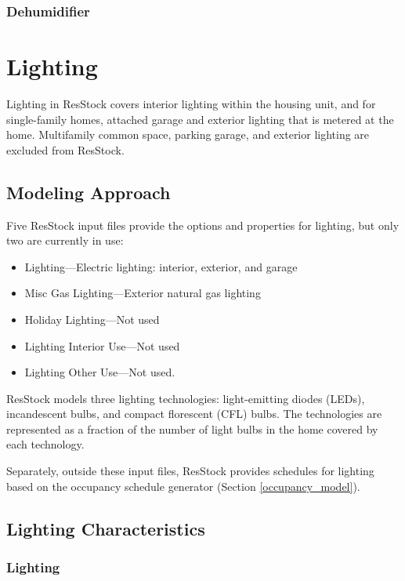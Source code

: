 \subsubsection{Dehumidifier}


\section{Lighting}
Lighting in ResStock covers interior lighting within the housing unit, and for single-family homes, attached garage and exterior lighting that is metered at the home. Multifamily common space, parking garage, and exterior lighting are excluded from ResStock.

\subsection{Modeling Approach}
Five ResStock input files provide the options and properties for lighting, but only two are currently in use:
\begin{itemize}
    \item{Lighting}---Electric lighting: interior, exterior, and garage
    \item{Misc Gas Lighting}---Exterior natural gas lighting
    \item{Holiday Lighting}---Not used
    \item{Lighting Interior Use}---Not used
    \item{Lighting Other Use}---Not used.
\end{itemize}

ResStock models three lighting technologies: light-emitting diodes (LEDs), incandescent bulbs, and compact florescent (CFL) bulbs. The technologies are represented as a fraction of the number of light bulbs in the home covered by each technology.

Separately, outside these input files, ResStock provides schedules for lighting based on the occupancy schedule generator (Section \ref{occupancy_model}).

\subsection{Lighting Characteristics}
\subsubsection{Lighting}\label{lighting}


